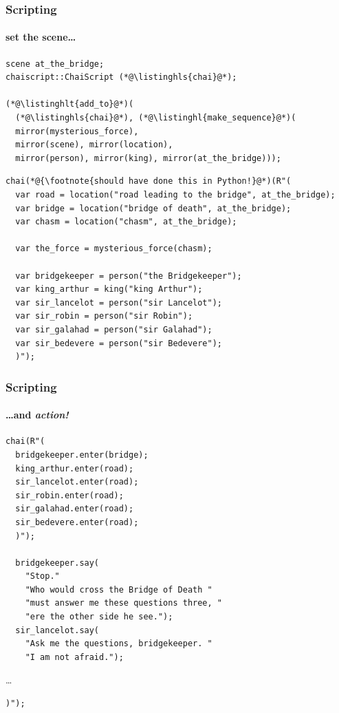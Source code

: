 \documentclass[compress,table,xcolor=table]{beamer}
\begin{document}
\begin{frame}[fragile]
  \frametitle{Scripting}
  \framesubtitle{set the scene\ldots}
  \begin{lstlisting}[language=c++2x,basicstyle=\scriptsize\ttfamily]
scene at_the_bridge;
chaiscript::ChaiScript (*@\listinghls{chai}@*);

(*@\listinghlt{add_to}@*)(
  (*@\listinghls{chai}@*), (*@\listinghl{make_sequence}@*)(
  mirror(mysterious_force),
  mirror(scene), mirror(location),
  mirror(person), mirror(king), mirror(at_the_bridge)));
  \end{lstlisting}
  \begin{lstlisting}[language=c++2x,basicstyle=\tiny\ttfamily]
chai(*@{\footnote{should have done this in Python!}@*)(R"(
  var road = location("road leading to the bridge", at_the_bridge);
  var bridge = location("bridge of death", at_the_bridge);
  var chasm = location("chasm", at_the_bridge);

  var the_force = mysterious_force(chasm);

  var bridgekeeper = person("the Bridgekeeper");
  var king_arthur = king("king Arthur");
  var sir_lancelot = person("sir Lancelot");
  var sir_robin = person("sir Robin");
  var sir_galahad = person("sir Galahad");
  var sir_bedevere = person("sir Bedevere");
  )");
  \end{lstlisting}
\end{frame}
\begin{frame}[fragile]
  \frametitle{Scripting}
  \framesubtitle{\ldots and {\em \larger action!}}
  \begin{lstlisting}[language=c++2x,basicstyle=\scriptsize\ttfamily]
chai(R"(
  bridgekeeper.enter(bridge);
  king_arthur.enter(road);
  sir_lancelot.enter(road);
  sir_robin.enter(road);
  sir_galahad.enter(road);
  sir_bedevere.enter(road);
  )");

  bridgekeeper.say(
    "Stop."
    "Who would cross the Bridge of Death "
    "must answer me these questions three, "
    "ere the other side he see.");
  sir_lancelot.say(
    "Ask me the questions, bridgekeeper. "
    "I am not afraid.");
  \end{lstlisting}
  \ldots
  \begin{lstlisting}[language=c++2x,basicstyle=\scriptsize\ttfamily]
  )");
  \end{lstlisting}
\end{frame}
\end{document}

